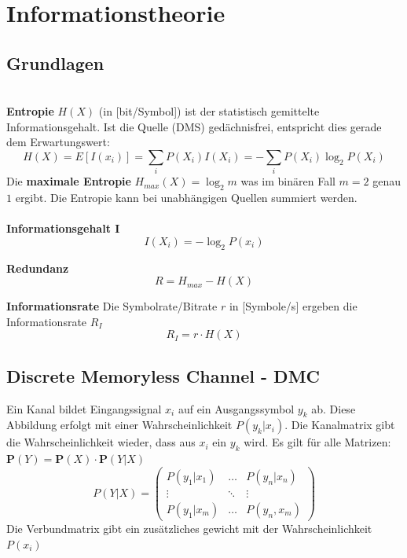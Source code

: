 \section{Informationstheorie}
\subsection{Grundlagen}\label{entropie}~\\
\textbf{Entropie} $H(X)$ (in [bit/Symbol]) ist der statistisch gemittelte Informationsgehalt. Ist die Quelle (DMS) gedächnisfrei, entspricht dies gerade dem Erwartungswert:
\[
H(X) = E[I(x_i)] = \sum_{i}P(X_i)I(X_i) = -\sum_{i}P(X_i)\log_2P(X_i)
\]
Die \textbf{maximale Entropie} $H_{max}(X) = \log_2 m$ was im binären Fall $m=2$ genau $1$ ergibt. Die Entropie kann bei unabhängigen Quellen summiert werden.~\\~\\

\textbf{Informationsgehalt I}
\[
I(X_i) = -\log_2P(x_i)
\]

\textbf{Redundanz}
\[
R = H_{max} - H(X)
\]

\textbf{Informationsrate}
Die Symbolrate/Bitrate $r$ in [Symbole/s] ergeben die Informationsrate $R_I$
\[
R_I = r\cdot H(X)
\]

\subsection{Discrete Memoryless Channel - DMC}
Ein Kanal bildet Eingangssignal $x_i$ auf ein Ausgangssymbol $y_k$ ab. Diese Abbildung erfolgt mit einer Wahrscheinlichkeit $P(y_k | x_i)$.
Die Kanalmatrix gibt die Wahrscheinlichkeit wieder, dass aus $x_i$ ein $y_k$ wird. Es gilt für alle Matrizen: $\mathbf{P}(Y) = \mathbf{P}(X) \cdot \mathbf{P}(Y|X)$
\[
P(Y|X) = \begin{pmatrix}
	P(y_1|x_1) & \dots & P(y_n|x_n) \\
	\vdots & \ddots & \vdots \\
	P(y_1|x_m) & \dots & P(y_n,x_m)
\end{pmatrix}
\]
Die Verbundmatrix gibt ein zusätzliches gewicht mit der Wahrscheinlichkeit $P(x_i)$

